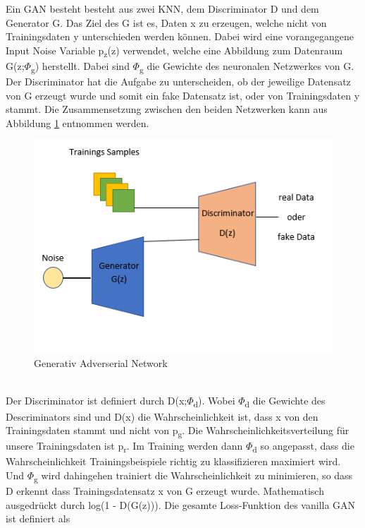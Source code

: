 \documentclass{llncs}
\begin{document}
Ein GAN besteht besteht aus zwei KNN, dem Discriminator D und dem Generator G. Das Ziel des G ist es, Daten x zu erzeugen, welche nicht von Trainingsdaten y unterschieden werden können. Dabei wird eine vorangegangene Input Noise Variable p\textsubscript{z}(z) verwendet, welche eine Abbildung zum Datenraum G(z;$\Phi$\textsubscript{g}) herstellt. Dabei sind $\Phi$\textsubscript{g} die Gewichte des neuronalen Netzwerkes von G. Der Discriminator hat die Aufgabe zu unterscheiden, ob der jeweilige Datensatz von G erzeugt wurde und somit ein fake Datensatz ist, oder von Trainingsdaten y stammt\cite{goodfellow2014}. Die Zusammensetzung zwischen den beiden Netzwerken kann aus Abbildung \ref{fig:Bild20} entnommen werden.
\\
\begin{figure}[htbp] 
	\centering
	\includegraphics[width=1.0\textwidth]{GAN_GRUNDAUFBAU.png}
	\caption{Generativ Adverserial Network}
	\label{fig:Bild20}
\end{figure}
\\
Der Discriminator ist definiert durch D(x;$\Phi$\textsubscript{d}). Wobei $\Phi$\textsubscript{d} die Gewichte des Descriminators sind und D(x) die Wahrscheinlichkeit ist, dass x von den Trainingsdaten stammt und nicht von p\textsubscript{g}. Die Wahrscheinlichkeitsverteilung für unsere Trainingsdaten ist p\textsubscript{r}.  Im Training werden dann $\Phi$\textsubscript{d} so angepasst, dass die Wahrscheinlichkeit Trainingsbeispiele richtig zu klassifizieren maximiert wird. Und $\Phi$\textsubscript{g} wird dahingehen trainiert die Wahrscheinlichkeit zu minimieren, so dass D erkennt dass Trainingsdatensatz x von G erzeugt wurde. Mathematisch ausgedrückt durch log(1 - D(G(z))). Die gesamte Loss-Funktion des vanilla GAN ist definiert als
\end{document}
